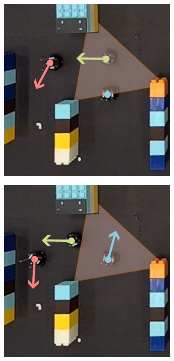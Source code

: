 \documentclass[letterpaper, 10 pt, conference]{ieeeconf}  %
\begin{document}
\begin{figure}[t]
\begin{subfigure}[b]{.25\linewidth}
         \caption{}
         \label{fig:expS4}
     \end{subfigure}
     \begin{subfigure}[b]{.25\linewidth}
         \centering
         \includegraphics[width=\linewidth]{experiment/s_Page_5.pdf}
         \caption{}
         \label{fig:expS6}
     \end{subfigure}
     \begin{subfigure}[b]{.25\linewidth}
         \centering
         \includegraphics[width=\linewidth]{experiment/s_Page_6.pdf}

\end{subfigure}
\end{figure}
\end{document}

